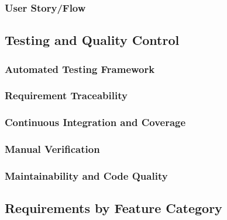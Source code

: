 \documentclass{article}
\begin{document}


\subsubsection{User Story/Flow} %


\subsection{Testing and Quality Control}
\subsubsection{Automated Testing Framework}
\subsubsection{Requirement Traceability}
\subsubsection{Continuous Integration and Coverage}
\subsubsection{Manual Verification}
\subsubsection{Maintainability and Code Quality}

\subsection{Requirements by Feature Category}
\end{document}
